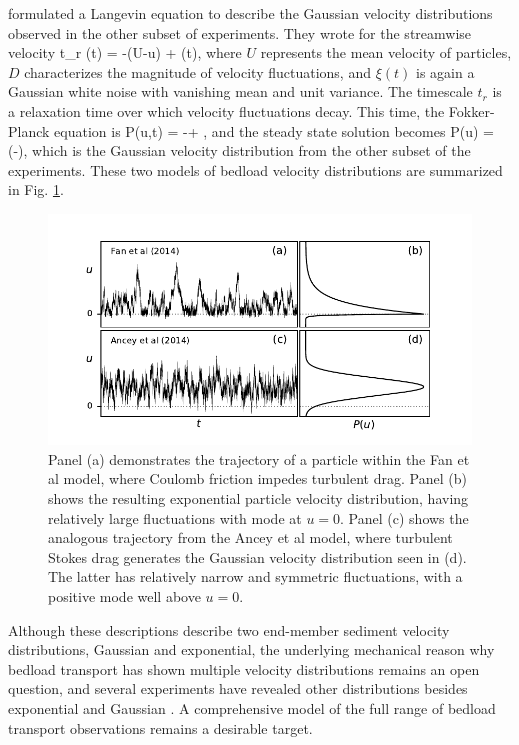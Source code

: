 \citet{Ancey2014} formulated a Langevin equation to describe the Gaussian velocity distributions observed in the other subset of experiments. They wrote for the streamwise velocity 
\be t_r (t) = -(U-u) + \xi(t),\ee
where $U$ represents the mean velocity of particles, $D$ characterizes the magnitude of velocity fluctuations, and $\xi(t)$ is again a Gaussian white noise with vanishing mean and unit variance. The timescale $t_r$ is a relaxation time over which velocity fluctuations decay. This time, the Fokker-Planck equation is
\be {} P(u,t) = - + ,\ee 
and the steady state solution becomes
\be P(u) =  \exp\Big(-\Big), \ee
which is the Gaussian velocity distribution from the other subset of the experiments.
These two models of bedload velocity distributions are summarized in Fig. \ref{fig:fanAncey}.
\begin{figure}[!htbp]
	\includegraphics[width=\linewidth,keepaspectratio]{./figures/ch1/fanAncey.pdf}
	\caption{Panel (a) demonstrates the trajectory of a particle within the Fan et al model, where Coulomb friction impedes turbulent drag. Panel (b) shows the resulting exponential particle velocity distribution, having relatively large fluctuations with mode at $u=0$.
	Panel (c) shows the analogous trajectory from the Ancey et al model, where turbulent Stokes drag generates the Gaussian velocity distribution seen in (d). The latter has relatively narrow and symmetric fluctuations, with a positive mode well above $u=0$.}
	\label{fig:fanAncey}
\end{figure}
Although these descriptions describe two end-member sediment velocity distributions, Gaussian and exponential, the underlying mechanical reason why bedload transport has shown multiple velocity distributions remains an open question, and several experiments have revealed other distributions besides exponential and Gaussian \citep[e.g.][]{Houssais2012,Liu2019}.
A comprehensive model of the full range of bedload transport observations remains a desirable target.

